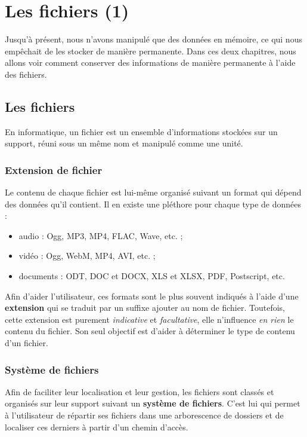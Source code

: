 \chapter{Les fichiers (1)}
\label{les-fichiers-(1)}

Jusqu'à présent, nous n'avons manipulé que des données en
mémoire, ce qui nous empêchait de les stocker de manière permanente.
Dans ces deux chapitres, nous allons voir comment conserver des
informations de manière permanente à l'aide des fichiers.

\section{Les fichiers}
\label{les-fichiers}

En informatique, un fichier est un ensemble d'informations stockées 
sur un support, réuni sous un même nom et manipulé comme une unité.

\subsection{Extension de fichier}
\label{extension-de-fichier}

Le contenu de chaque fichier est lui-même organisé suivant un format qui
dépend des données qu'il contient. Il en existe une pléthore pour chaque
type de données :

\begin{itemize}
\item
  audio : Ogg, MP3, MP4, FLAC, Wave, etc. ;
\item
  vidéo : Ogg, WebM, MP4, AVI, etc. ;
\item
  documents : ODT, DOC et DOCX, XLS et XLSX, PDF, Postscript, etc.
\end{itemize}

Afin d'aider l'utilisateur, ces formats sont le plus souvent indiqués à
l'aide d'une \textbf{extension} qui se traduit par un suffixe ajouter au
nom de fichier. Toutefois, cette extension est purement
\emph{indicative} et \emph{facultative}, elle n'influence \emph{en rien}
le contenu du fichier. Son seul objectif est d'aider à déterminer le
type de contenu d'un fichier.

\subsection{Système de fichiers}
\label{systeme-de-fichiers}

Afin de faciliter leur localisation et leur gestion, les fichiers sont
classés et organisés sur leur support suivant un \textbf{système de
fichiers}. C'est lui qui permet à l'utilisateur de répartir ses fichiers
dans une arborescence de dossiers et de localiser ces derniers à partir
d'un chemin d'accès.

